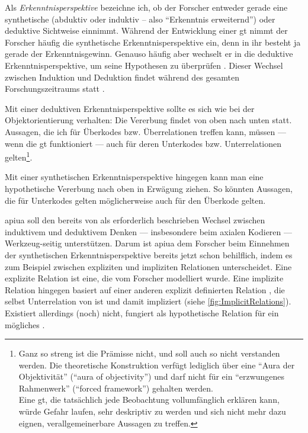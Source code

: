 Als \textit{Erkenntnisperspektive} bezeichne ich, ob der Forscher entweder gerade eine synthetische (abduktiv oder induktiv -- also ``Erkenntnis erweiternd'') oder deduktive \citep{Rehfus:2003ti} Sichtweise einnimmt. Während der Entwicklung einer \gls{gt} nimmt der Forscher häufig die synthetische Erkenntnisperspektive ein, denn in ihr besteht ja gerade der Erkenntnisgewinn. Genauso häufig aber wechselt er in die deduktive Erkenntnisperspektive, um seine Hypothesen zu überprüfen \citep{kelle1994empirisch}. Dieser Wechsel zwischen Induktion und Deduktion findet während des gesamten Forschungszeitraums statt \citep[siehe  und][]{strauss1987qualitative}.

Mit einer deduktiven Erkenntnisperspektive sollte es sich wie bei der Objektorientierung verhalten: Die Vererbung findet von oben nach unten statt. Aussagen, die ich für Überkodes bzw. Überrelationen treffen kann, müssen --- wenn die \gls{gt} funktioniert --- auch für deren Unterkodes bzw. Unterrelationen gelten\footnote{Ganz so streng ist die Prämisse nicht, und soll auch so nicht verstanden werden. Die theoretische Konstruktion verfügt lediglich über eine ``Aura der Objektivität'' (``aura of objectivity'') und darf nicht für ein ``erzwungenes Rahmenwerk'' (``forced framework'') gehalten werden. \citep{charmaz2006constructing}\\ Eine \gls{gt}, die tatsächlich jede Beobachtung vollumfänglich erklären kann, würde Gefahr laufen, sehr deskriptiv zu werden und sich nicht mehr dazu eignen, verallgemeinerbare Aussagen zu treffen.}. 

Mit einer synthetischen Erkenntnisperspektive hingegen kann man eine hypothetische Vererbung nach oben in Erwägung ziehen. So könnten Aussagen, die für Unterkodes gelten möglicherweise auch für den Überkode gelten.

\gls{apiua} soll den bereits von \cite{Glaser:1967ts} als erforderlich beschrieben Wechsel zwischen induktivem und deduktivem Denken --- insbesondere beim axialen Kodieren \citep{strauss1990basics} --- Werkzeug-seitig unterstützen. Darum ist \gls{apiua} dem Forscher beim Einnehmen der synthetischen Erkenntnisperspektive bereits jetzt schon behilflich, indem es zum Beispiel zwischen expliziten und impliziten Relationen unterscheidet. Eine explizite Relation  ist eine, die vom Forscher modelliert wurde. Eine implizite Relation hingegen basiert auf einer anderen explizit definierten Relation , die selbst Unterrelation von  ist und damit  impliziert (siehe \autoref{fig:ImplicitRelations}). Existiert  allerdings (noch) nicht, fungiert  als hypothetische Relation für ein mögliches . %

